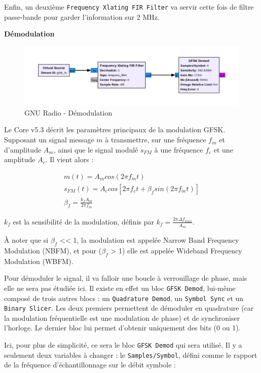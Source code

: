 Enfin, un deuxième \texttt{Frequency\ Xlating\ FIR\ Filter} va servir
cette fois de filtre passe-bande pour garder l'information sur 2 MHz.

\textbf{Démodulation}

\begin{figure}
\centering
\includegraphics{static/ble-demod.png}
\caption{GNU Radio - Démodulation}
\end{figure}

Le Core v5.3 décrit les paramètres principaux de la modulation GFSK.
Supposant un signal message \(m\) à transmettre, sur une fréquence
\(f_m\) et d'amplitude \(A_m\), ainsi que le signal modulé \(s_{FM}\) à
une fréquence \(f_c\) et une amplitude \(A_c\). Il vient alors :

\[\begin{align}
{m(t) = A_m cos(2 \pi f_m t)} \\
{s_{FM}(t) = A_c cos[2\pi f_c t + \beta_f sin(2 \pi f_mt)]} \\
{\beta_f = \frac{k_f A_m}{2 \pi f_m}}
\end{align}\]

\(k_f\) est la sensibilité de la modulation, définis par
\(k_ f = \frac{2 \pi \Delta f_{max}}{A_m}\).

À noter que si \(\beta_f\) \textless\textless{} 1, la modulation est
appelée Narrow Band Frequency Modulation (NBFM), et pour (\(\beta_f\)
\textgreater{} 1) elle est appelée Wideband Frequency Modulation (WBFM).

Pour démoduler le signal, il va falloir une boucle à verrouillage de
phase, mais elle ne sera pas étudiée ici. Il existe en effet un bloc
\texttt{GFSK\ Demod}, lui-même composé de trois autres blocs : un
\texttt{Quadrature\ Demod}, un \texttt{Symbol\ Sync} et un
\texttt{Binary\ Slicer}. Les deux premiers permettent de démoduler en
quadrature (car la modulation fréquentielle est une modulation de phase)
et de synchroniser l'horloge. Le dernier bloc lui permet d'obtenir
uniquement des bits (0 ou 1).

Ici, pour plus de simplicité, ce sera le bloc \texttt{GFSK\ Demod} qui
sera utilisé. Il y a seulement deux variables à changer : le
\texttt{Samples/Symbol}, défini comme le rapport de la fréquence
d'échantillonnage sur le débit symbole :

